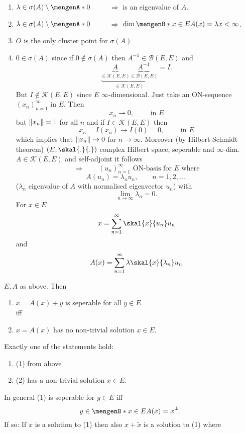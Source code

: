 \begin{enumerate}
	\item $\lambda \in \sigma(A) \setminus \set{0}$ $\qquad $ $\Rightarrow$ is an eigenvalue of $A$. 
	\item $\lambda \in \sigma(A) \setminus \set{0}$ $\qquad $ $\Rightarrow $ $\dim \set[x \in E]{A(x) = \lambda x} < \infty$.
	\item $O$ is the only cluster point for $\sigma(A)$ 
	\item $0 \in \sigma(A)$ since if $0 \not \in \sigma(A)$ then $A^{-1} \in \mathcal{B}(E,E)$ and \[
		\underset{\in \mathcal{K}(E,E)}{\underbrace{\underset{\in \mathcal{K}(E,E)}{\underbrace{A}} \underset{\in \mathcal{B}(E,E)}{\underbrace{A^{-1}}}}} = I.
	\]
	But $I \not \in \mathcal{K}(E,E)$ since $E$ $\infty$-dimensional. Just take an ON-sequence $(x_n)_{n=1}^{\infty}$ in $E$. Then \[
		x_n \rightharpoonup 0, \qquad \text{ in }E
	\]
	but $\norm{x_n}=1$ for all $n$ and if $I \in \mathcal{K}(E,E)$ then 
	\[
		x_n = I(x_n) \to I(0) = 0, \qquad  \text{ in }E
	\]
	which implies that $\norm{x_n}\to 0$ for $n \to \infty$. Moreover (by Hilbert-Schmidt theorem) $(E, \skal{.}{.})$ complex Hilbert space, seperable and $\infty$-dim. $A \in \mathcal{K}(E,E)$ and self-adjoint it follows
	\[
		\Rightarrow \qquad (u_n)_{n=1}^{\infty} \text{ ON-basis for $E$ where}
	\]
	\[
		A(u_n) = \lambda_n u_n, \qquad n=1,2,\dots.
	\]
	($\lambda_n$ eigenvalue of $A$ with normalised eigenvector $u_n$) with
	\[
		\lim_{n \to \infty}\lambda_n = 0.
	\]
	For $x \in E$
	\[
		x = \sum_{n=1}^{\infty} \skal{x}{u_n}u_n
	\]
	and
	\[
		A(x) = \sum_{n=1}^{\infty}\lambda \skal{x}{\lambda_n}u_n
	\]
\end{enumerate}
$E,A$ as above. Then
\begin{enumerate}
	\item $x = A(x) + y$ is seperable for all $y \in E$. \\
	iff
	\item $x = A(x)$ has no non-trivial solution $x \in E$.
\end{enumerate}
Exactly one of the statements hold:
\begin{enumerate}
	\item (1) from above
	\item (2) has a non-trivial solution $x \in E$.
\end{enumerate}
In general (1) is seperable for $y \in E$ iff 
\[
	y \in \set[x \in E]{A(x)=x}^{\perp}.
\]
If so: If $x$ is a solution to (1) then also $x + \tilde x$ is a solution to (1) where
